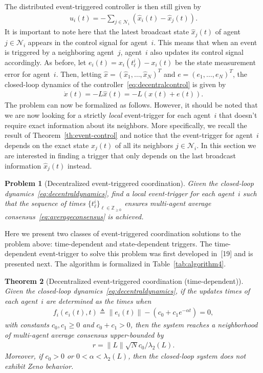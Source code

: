 \documentclass[]{book}
\newtheorem{theorem}{Theorem}[section]
\newtheorem{problem}[theorem]{Problem}
\newcommand{\integernonnegative}{\mathbb{Z}_{\ge 0}}
\newcommand{\NN}{{\mathcal{N}}}
\newcommand{\TwoNorm}[1]{\|#1\|_2}
\renewcommand{\TwoNorm}[1]{\|#1\|}
\begin{document}
The distributed event-triggered controller is then still given by
\begin{align}\label{eq:decentralcontrol2}
  u_i(t) = - \sum_{j \in \NN_i} (\hat{x}_i(t) - \hat{x}_j(t) ) .
\end{align}
It is important to note here that the latest broadcast state
$\hat{x}_j(t)$ of agent $j \in \NN_i$ appears in the control signal
for agent~$i$. This means that when an event is triggered by a
neighboring agent~$j$, agent~$i$ also updates its control signal
accordingly.  As before, let $e_i(t) = x_i(t_\ell^i) - x_i(t)$ be the
state measurement error for agent~$i$. Then, letting $\hat{x} =
(\hat{x}_1, \dots, \hat{x}_N)^T$ and $e = (e_1, \dots, e_N)^T$, the
closed-loop dynamics of the controller~\eqref{eq:decentralcontrol} is
given by
\begin{align}\label{eq:decentraldynamics2}
  \dot{x}(t) = - L \hat{x}(t) = - L ( x(t) + e(t) ).
\end{align}
The problem can now be formalized as follows. However, it should be
noted that we are now looking for a strictly \emph{local}
event-trigger for each agent~$i$ that doesn't require exact
information about its neighbors. More specifically, we recall the
result of Theorem~\ref{th:event-control} and notice that the
event-trigger for agent~$i$ depends on the exact state $x_j(t)$ of all
its neighbors $j \in \NN_i$. In this section we are interested in
finding a trigger that only depends on the last broadcast information
$\hat{x}_j(t)$ instead.

\begin{problem}[Decentralized event-triggered coordination]
  Given the closed-loop dynamics~\eqref{eq:decentraldynamics}, find a
  local event-trigger for each agent~$i$ such that the sequence of
  times $\{ t_\ell^i \}_{\ell \in \integernonnegative}$ ensures
  multi-agent average consensus~\eqref{eq:averageconsensus} is
  achieved.
\end{problem}

Here we present two classes of event-triggered coordination solutions
to the problem above: time-dependent and state-dependent triggers. The
time-dependent event-trigger to solve this problem was first developed
in~[19] and is presented next. The algorithm is
formalized in Table~\ref{tab:algorithm4}.

\begin{theorem}[Decentralized event-triggered coordination
  (time-dependent)]\label{th:time}
  Given the closed-loop dynamics~\eqref{eq:decentraldynamics}, if the
  updates times of each agent~$i$ are determined as the times when
  \begin{align}
    f_i(e_i(t),t) \triangleq \TwoNorm{e_i(t)} - (c_0 + c_1 e^{-\alpha
      t} ) = 0,
  \end{align}
  with constants $c_0, c_1 \geq 0$ and $c_0 + c_1 > 0$, then the
  system reaches a neighborhood of multi-agent average consensus
  upper-bounded by
  \begin{align*}
    r = \TwoNorm{L} \sqrt{N} c_0 / \lambda_2(L) .
  \end{align*}
  Moreover, if $c_0 > 0$ or $0 < \alpha < \lambda_2(L)$, then the closed-loop
  system does not exhibit Zeno behavior.
\end{theorem}
\end{document}
